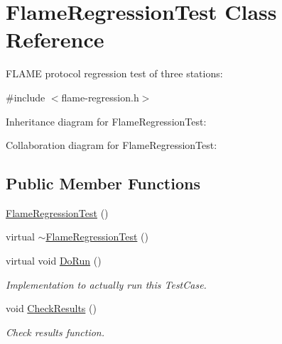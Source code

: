 \hypertarget{classFlameRegressionTest}{}\section{Flame\+Regression\+Test Class Reference}
\label{classFlameRegressionTest}


F\+L\+A\+ME protocol regression test of three stations\+:  




{\ttfamily \#include $<$flame-\/regression.\+h$>$}



Inheritance diagram for Flame\+Regression\+Test\+:


Collaboration diagram for Flame\+Regression\+Test\+:
\subsection*{Public Member Functions}
\begin{DoxyCompactItemize}
\item 
\hyperlink{classFlameRegressionTest_a20c931a78182815ded4195a5faf7eba6}{Flame\+Regression\+Test} ()
\item 
virtual \hyperlink{classFlameRegressionTest_a2b76b9f0ed8706bcf0c89d715b9972e8}{$\sim$\+Flame\+Regression\+Test} ()
\item 
virtual void \hyperlink{classFlameRegressionTest_aa1cc862bafd9d367a75cc42c9779b603}{Do\+Run} ()
\begin{DoxyCompactList}\small\item\em Implementation to actually run this Test\+Case. \end{DoxyCompactList}\item 
void \hyperlink{classFlameRegressionTest_a2937295ad65fd72117e3a7580d74ed85}{Check\+Results} ()
\begin{DoxyCompactList}\small\item\em Check results function. \end{DoxyCompactList}\end{DoxyCompactItemize}
